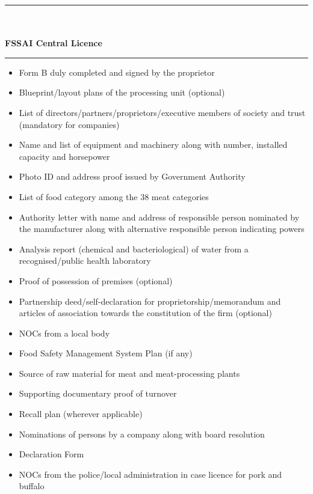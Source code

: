 \documentclass[a4paper, 12pt, twoside]{article}
\begin{document}
\noindent\rule{16cm}{0.4pt}\\
	\\
\textbf{FSSAI Central Licence}\\
\noindent\rule{16cm}{0.4pt}
\begin{itemize}[noitemsep]
\item Form B duly completed and signed by the proprietor 
\item Blueprint/layout plans of the processing unit (optional) 
\item List of directors/partners/proprietors/executive members of society and trust (mandatory for companies) 
\item Name and list of equipment and machinery along with number, installed capacity and horsepower  
\item Photo ID and address proof issued by Government Authority 
\item List of food category among the 38 meat categories
\item Authority letter with name and address of responsible person nominated by the manufacturer along with alternative responsible person indicating powers   
\item Analysis report (chemical and bacteriological) of water from a recognised/public health laboratory  
\item Proof of possession of premises (optional) 
\item Partnership deed/self-declaration for proprietorship/memorandum and articles of association towards the constitution of the firm (optional)   
\item NOCs from a local body 
\item Food Safety Management System Plan (if any) 
\item Source of raw material for meat and meat-processing plants 
\item Supporting documentary proof of turnover 
\item Recall plan (wherever applicable) 
\item Nominations of persons by a company along with board resolution 
\item Declaration Form 
\item NOCs from the police/local administration in case licence for pork and buffalo  
\end{itemize}
\end{document}

